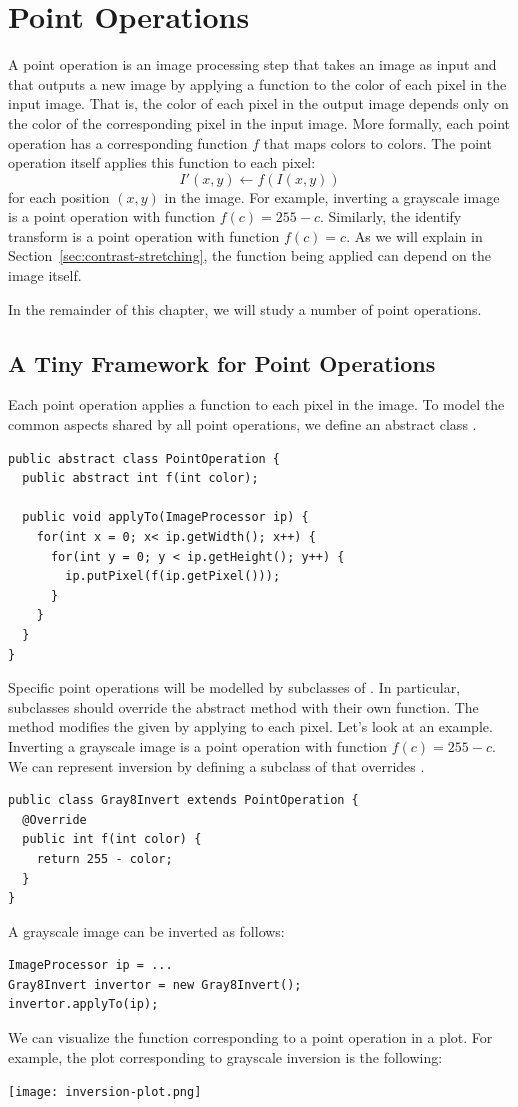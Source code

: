 \documentclass{book}
\begin{document}
\addtocounter{chapter}{3}

\chapter{Point Operations}
A point operation is an image processing step that takes an image as input and that outputs a new image by applying a function to the color of each pixel in the input image. That is, the color of each pixel in the output image depends only on the color of the corresponding pixel in the input image. More formally, each point operation has a corresponding function $f$ that maps colors to colors. The point operation itself applies this function to each pixel:
$$I'(x, y) \leftarrow f(I(x, y))$$
for each position $(x, y)$ in the image. For example, inverting a grayscale image is a point operation with function $f(c) = 255 - c$. Similarly, the identify transform is a point operation with function $f(c) = c$. As we will explain in Section~\ref{sec:contrast-stretching}, the function being applied can depend on the image itself.

In the remainder of this chapter, we will study a number of point operations.

\section{A Tiny Framework for Point Operations}
Each point operation applies a function to each pixel in the image. To model the common aspects shared by all point operations, we define an abstract class . 
\begin{lstlisting}
public abstract class PointOperation {
  public abstract int f(int color);
  
  public void applyTo(ImageProcessor ip) {
    for(int x = 0; x< ip.getWidth(); x++) {
      for(int y = 0; y < ip.getHeight(); y++) {
        ip.putPixel(f(ip.getPixel()));      
      }    
    }
  }
}
\end{lstlisting}
Specific point operations will be modelled by subclasses of . In particular, subclasses should override the abstract method  with their own function. The method  modifies the given  by applying  to each pixel. Let's look at an example. Inverting a grayscale image is a point operation with function $f(c) = 255 - c$. We can represent inversion by defining a subclass of  that overrides . 
\begin{lstlisting}
public class Gray8Invert extends PointOperation {
  @Override  
  public int f(int color) {
    return 255 - color;
  }
}
\end{lstlisting}
A grayscale image can be inverted as follows:
\begin{lstlisting}
ImageProcessor ip = ...
Gray8Invert invertor = new Gray8Invert();
invertor.applyTo(ip);
\end{lstlisting}
We can visualize the function corresponding to a point operation in a plot. For example, the plot corresponding to grayscale inversion is the following:
\begin{center}
\texttt{[image: inversion-plot.png]} %
\end{center}
\end{document}
